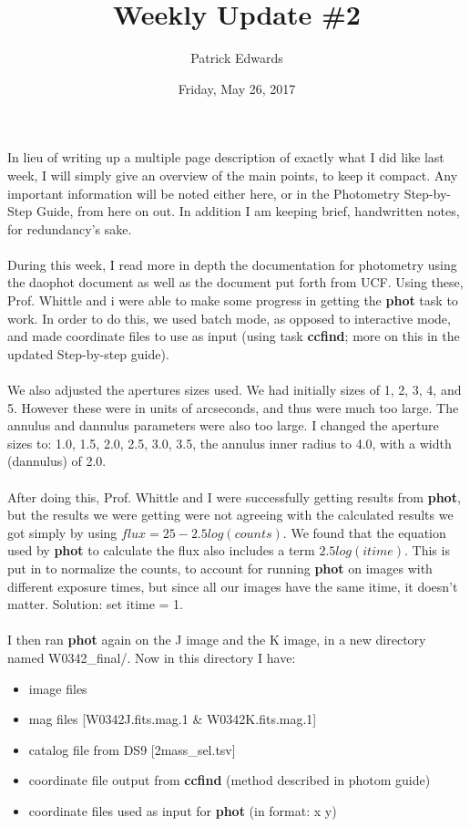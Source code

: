 \documentclass[a4paper]{article}
\title{Weekly Update \#2}
\author{Patrick Edwards}
\begin{document}
\date{Friday, May 26, 2017}
\maketitle

In lieu of writing up a multiple page description of exactly what I did like last week, I will simply give an overview of the main points, to keep it compact.  Any important information will be noted either here, or in the Photometry Step-by-Step Guide, from here on out. In addition I am keeping brief, handwritten notes, for redundancy's sake.\\ \\
During this week, I read more in depth the documentation for photometry using the daophot document as well as the document put forth from UCF.  Using these, Prof. Whittle and i were able to make some progress in getting the \textbf{phot} task to work.  In order to do this, we used batch mode, as opposed to interactive mode, and made coordinate files to use as input (using task \textbf{ccfind}; more on this in the updated Step-by-step guide).  \\ \\ 
We also adjusted the apertures sizes used.  We had initially sizes of 1, 2, 3, 4, and 5.  However these were in units of arcseconds, and thus were much too large.  The annulus and dannulus parameters were also too large.  I changed the aperture sizes to: 1.0, 1.5, 2.0, 2.5, 3.0, 3.5, the annulus inner radius to 4.0, with a width (dannulus) of 2.0.  \\ \\
After doing this, Prof. Whittle and I were successfully getting results from \textbf{phot}, but the results we were getting were not agreeing with the calculated results we got simply by using $flux = 25 - 2.5log(counts)$.  We found that the equation used by \textbf{phot} to calculate the flux also includes a term $2.5log(itime)$.  This is put in to normalize the counts, to account for running \textbf{phot} on images with different exposure times, but since all our images have the same itime, it doesn't matter.  Solution: set itime = 1. \\ \\
I then ran \textbf{phot} again on the J image and the K image, in a new directory named W0342\_final/.  Now in this directory I have: 
\begin{itemize}
\item image files
\item mag files [W0342J.fits.mag.1 \& W0342K.fits.mag.1]
\item catalog file from DS9 [2mass\_sel.tsv]
\item coordinate file output from \textbf{ccfind} (method described in photom guide)
\item coordinate files used as input for \textbf{phot} (in format: x y)
\end{itemize}
\end{document}
